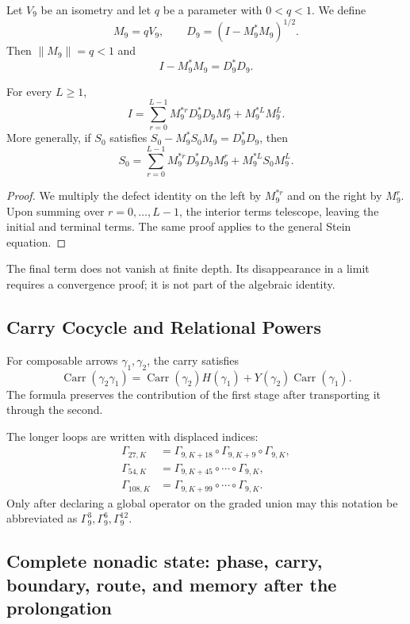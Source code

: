 Let \(V_9\) be an isometry and let \(q\) be a parameter with \(0<q<1\). We define
\[
 M_9=qV_9,
 \qquad
 D_9=(I-M_9^*M_9)^{1/2}.
\]
Then \(\|M_9\|=q<1\) and
\[
 I-M_9^*M_9=D_9^*D_9.
\]

\begin{theorem}
\label{p12-83-c7-s1:thm:stein-telescopia-terminal}
For every \(L\geq1\),
\[
 \boxed{
 I=
 \sum_{r=0}^{L-1}M_9^{*r}D_9^*D_9M_9^r
 +M_9^{*L}M_9^L.}
\]
More generally, if \(S_0\) satisfies
\(S_0-M_9^*S_0M_9=D_9^*D_9\), then
\[
 \boxed{
 S_0=
 \sum_{r=0}^{L-1}M_9^{*r}D_9^*D_9M_9^r
 +M_9^{*L}S_0M_9^L.}
\]
\end{theorem}

\begin{proof}
We multiply the defect identity on the left by \(M_9^{*r}\) and on the
right by \(M_9^r\). Upon summing over \(r=0,\ldots,L-1\), the interior terms
telescope, leaving the initial and terminal terms. The same proof
applies to the general Stein equation.
\end{proof}

The final term does not vanish at finite depth. Its disappearance in a
limit requires a convergence proof; it is not part of the algebraic
identity.

\subsection{Carry Cocycle and Relational Powers}

For composable arrows \(\gamma_1,\gamma_2\), the carry satisfies
\[
 \operatorname{Carr}(\gamma_2\gamma_1)
 =\operatorname{Carr}(\gamma_2)H(\gamma_1)
 +Y(\gamma_2)\operatorname{Carr}(\gamma_1).
\]
The formula preserves the contribution of the first stage after transporting it through the second.

The longer loops are written with displaced indices:
\begin{align*}
 \Gamma_{27,K}
 &=\Gamma_{9,K+18}\circ\Gamma_{9,K+9}\circ\Gamma_{9,K},\\
 \Gamma_{54,K}
 &=\Gamma_{9,K+45}\circ\cdots\circ\Gamma_{9,K},\\
 \Gamma_{108,K}
 &=\Gamma_{9,K+99}\circ\cdots\circ\Gamma_{9,K}.
\end{align*}
Only after declaring a global operator on the graded union may
this notation be abbreviated as \(\Gamma_9^3,\Gamma_9^6,\Gamma_9^{12}\).

\subsection{Complete nonadic state: phase, carry, boundary, route, and memory after the prolongation}

